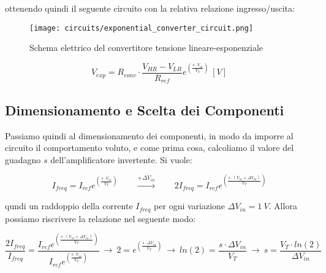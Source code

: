 ottenendo quindi il seguente circuito con la relativa relazione ingresso/uscita:

\begin{figure}[H]
    \centering
    \texttt{[image: circuits/exponential\_converter\_circuit.png]}
    \caption{Schema elettrico del convertitore tensione lineare-esponenziale}
    \label{exponential_converter_circuit}
\end{figure}

\begin{equation}\label{expo_converter}
    V_{exp}=R_{conv}\cdot \frac{V_{HR}-V_{LR}}{R_{ref}}e^{\left(\frac{s\cdot V_{in}}{V_T}\right)}\ [V]
\end{equation}


\subsection*{Dimensionamento e Scelta dei Componenti}


Passiamo quindi al dimensionamento dei componenti, in modo da imporre al circuito il
comportamento voluto, e come prima cosa, calcoliamo il valore del guadagno $s$
dell'amplificatore invertente. Si vuole:

\begin{equation}\label{iref_doubling}
    I_{freq}=I_{ref}e^{\left(\frac{s\cdot V_{in}}{V_T}\right)}
    \qquad
    \xrightarrow{+\Delta V_{in}}
    \qquad
    2I_{freq}=I_{ref}e^{\left(\frac{s\cdot(V_{in}+\Delta V_{in})}{V_T}\right)}
\end{equation}

qundi un raddoppio della corrente $I_{freq}$ per ogni variazione $\Delta V_{in}=1\ V$.
Allora possiamo riscrivere la relazione nel seguente modo:

\begin{equation}\label{s1}
    \frac{2I_{freq}}{I_{freq}}=
    \frac{I_{ref}e^{\left(\frac{s\cdot(V_{in}+\Delta V_{in})}{V_T}\right)}}
    {I_{ref}e^{\left(\frac{s\cdot V_{in}}{V_T}\right)}}
    \
    \rightarrow
    \
    2=e^{\left(\frac{s\cdot\Delta V_{in}}{V_T}\right)}
    \
    \rightarrow
    \
    ln(2)=\frac{s\cdot\Delta V_{in}}{V_T}
    \
    \rightarrow
    \
    s=\frac{V_T\cdot ln(2)}{\Delta V_{in}}
\end{equation}

